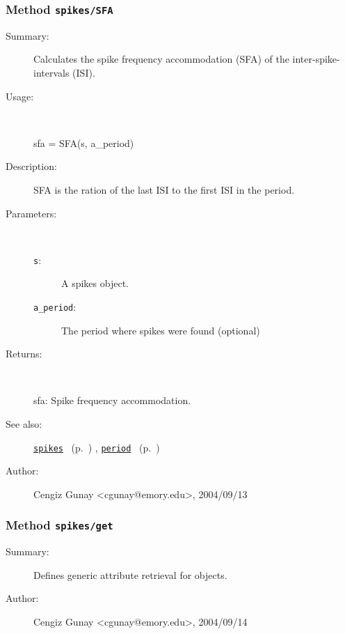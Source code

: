 \subsubsection[Method \texttt{SFA}]{Method \texttt{spikes/SFA}}%
%
\label{ref_spikes__SFA}%
\hypertarget{ref_spikes__SFA}{}%
\begin{description}
\item[Summary:]Calculates the spike frequency accommodation (SFA) of the 
	inter-spike-intervals (ISI).
%
\item[Usage:]~%
\begin{lyxcode}%
sfa = SFA(s, a\_period)
%
\end{lyxcode}%
%
\item[Description:]%
SFA is the ration of the last ISI to the first ISI in the period.
\item[Parameters:]~
\begin{description}%
\item[\texttt{s}:]
 A spikes object.
\item[\texttt{a\_period}:]
 The period where spikes were found (optional)
\end{description}%
%
\item[Returns:]~

	sfa: Spike frequency accommodation.
%
%
\item[See also:]%
\hyperlink{ref_spikes}{\texttt{spikes}}%
\ (p.~\pageref{ref_spikes})%
%
, \hyperlink{ref_period}{\texttt{period}}%
\ (p.~\pageref{ref_period})%
%
%
\item[Author:]%
Cengiz Gunay <cgunay@emory.edu>, 2004/09/13%
\end{description}
\methodline%
\subsubsection[Method \texttt{get}]{Method \texttt{spikes/get}}%
%
\label{ref_spikes__get}%
\hypertarget{ref_spikes__get}{}%
\begin{description}
\item[Summary:]Defines generic attribute retrieval for objects.
%
%
%
%
%
%
%
\item[Author:]%
Cengiz Gunay <cgunay@emory.edu>, 2004/09/14%
\end{description}
\methodline%
